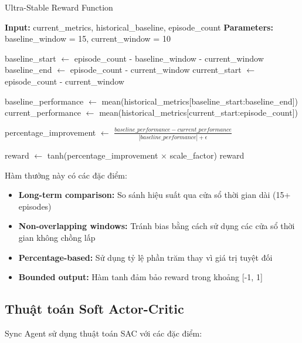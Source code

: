 \begin{algorithm}[!htp]
    \caption{Ultra-Stable Reward Function}
    \begin{algorithmic}[1]
        \State \textbf{Input:} current\_metrics, historical\_baseline, episode\_count 
        \State \textbf{Parameters:} baseline\_window = 15, current\_window = 10 
             
        \EndIf
        
        \State baseline\_start $\leftarrow$ episode\_count - baseline\_window - current\_window
        \State baseline\_end $\leftarrow$ episode\_count - current\_window
        \State current\_start $\leftarrow$ episode\_count - current\_window
        
        \State baseline\_performance $\leftarrow$ mean(historical\_metrics[baseline\_start:baseline\_end])
        \State current\_performance $\leftarrow$ mean(historical\_metrics[current\_start:episode\_count])
        
        \State percentage\_improvement $\leftarrow$ $\frac{baseline\_performance - current\_performance}{|baseline\_performance| + \epsilon}$
        
        \State reward $\leftarrow$ tanh(percentage\_improvement $\times$ scale\_factor)
        \Return reward
    \end{algorithmic}
\end{algorithm}

Hàm thưởng này có các đặc điểm:
\begin{itemize}
    \item \textbf{Long-term comparison:} So sánh hiệu suất qua cửa sổ thời gian
        dài (15+ episodes)

    \item \textbf{Non-overlapping windows:} Tránh bias bằng cách sử dụng các cửa
        sổ thời gian không chồng lấp

    \item \textbf{Percentage-based:} Sử dụng tỷ lệ phần trăm thay vì giá trị
        tuyệt đối

    \item \textbf{Bounded output:} Hàm tanh đảm bảo reward trong khoảng [-1, 1]
\end{itemize}

\subsection{Thuật toán Soft Actor-Critic}
Sync Agent sử dụng thuật toán SAC với các đặc điểm:

